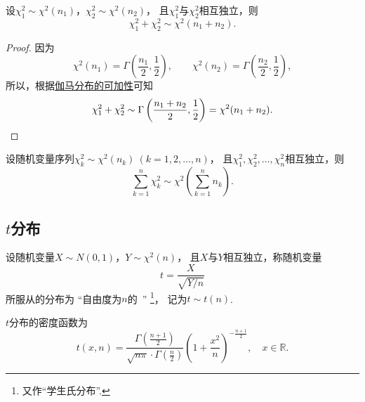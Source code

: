\begin{theorem}[可加性]\label{theorem:数理统计的基础知识.卡方分布的可加性1}
设\(\chi^2_1 \sim \chi^2(n_1)\)，\(\chi^2_2 \sim \chi^2(n_2)\)，
且\(\chi^2_1\)与\(\chi^2_2\)相互独立，则\begin{equation}
	\chi^2_1 + \chi^2_2 \sim \chi^2(n_1+n_2).
\end{equation}
\begin{proof}
因为\begin{equation*}
	\chi^2(n_1) = \Gamma\left(\frac{n_1}{2},\frac12\right), \qquad
	\chi^2(n_2) = \Gamma\left(\frac{n_2}{2},\frac12\right),
\end{equation*}
所以，根据\hyperref[theorem:多维随机变量及其分布.伽马分布的可加性1]{伽马分布的可加性}可知\begin{equation*}
	\chi^2_1 + \chi^2_2 \sim \Gamma\left(\frac{n_1+n_2}{2},\frac12\right)
	= \chi^2(n_1+n_2).
	\qedhere
\end{equation*}
\end{proof}
\end{theorem}

\begin{corollary}\label{theorem:数理统计的基础知识.卡方分布的可加性2}
设随机变量序列\(\chi^2_k \sim \chi^2(n_k)\ (k=1,2,\dotsc,n)\)，
且\(\chi^2_1,\chi^2_2,\dotsc,\chi^2_n\)相互独立，则\begin{equation}
	\sum_{k=1}^n \chi^2_k \sim \chi^2\left(\sum_{k=1}^n{n_k}\right).
\end{equation}
\end{corollary}

\subsection{\texorpdfstring{\(t\)}{t}分布}
\begin{definition}
设随机变量\(X \sim N(0,1)\)，\(Y \sim \chi^2(n)\)，
且\(X\)与\(Y\)相互独立，称随机变量\begin{equation}
	t = \frac{X}{\sqrt{Y/n}}
\end{equation}
所服从的分布为
“自由度为\(n\)的~”
\footnote{又作“学生氏分布”.}，
记为\(t \sim t(n)\).
\end{definition}

\begin{theorem}\label{theorem:数理统计的基础知识.学生氏分布的密度函数}
\(t\)分布的密度函数为\begin{equation}
	t(x,n) = \frac{
		\Gamma\left(\frac{n+1}{2}\right)
	}{
		\sqrt{n\pi} \cdot \Gamma\left(\frac{n}{2}\right)
	}
	\left(1+\frac{x^2}{n}\right)^{-\frac{n+1}{2}},
	\quad x \in \mathbb{R}.
\end{equation}
\end{theorem}


